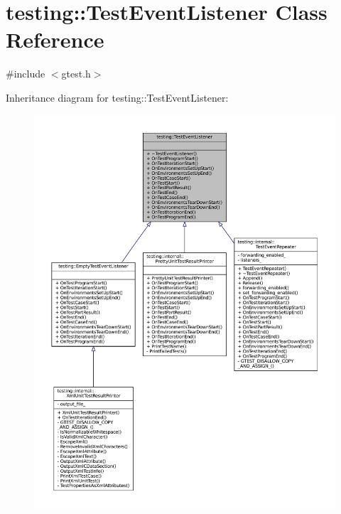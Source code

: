 \hypertarget{classtesting_1_1TestEventListener}{}\section{testing\+:\+:Test\+Event\+Listener Class Reference}
\label{classtesting_1_1TestEventListener}


{\ttfamily \#include $<$gtest.\+h$>$}



Inheritance diagram for testing\+:\+:Test\+Event\+Listener\+:
\nopagebreak
\begin{figure}[H]
\begin{center}
\leavevmode
\includegraphics[width=350pt]{classtesting_1_1TestEventListener__inherit__graph}
\end{center}
\end{figure}


